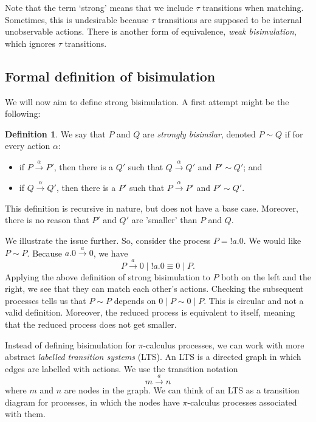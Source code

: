\documentclass[a4paper, openany]{memoir}
\theoremstyle{definition}
\newtheorem{definition}[proposition]{Definition}
\begin{document}
    Note that the term `strong' means that we include $\tau$ transitions when matching. Sometimes, this is undesirable because $\tau$ transitions are supposed to be internal unobservable actions. There is another form of equivalence, \emph{weak bisimulation}, which ignores $\tau$ transitions.

    \subsection{Formal definition of bisimulation}
    We will now aim to define strong bisimulation. A first attempt might be the following:
    \begin{definition}
        We say that $P$ and $Q$ are \emph{strongly bisimilar}, denoted $P \sim Q$ if for every action $\alpha$:
        \begin{itemize}
            \item if $P \xrightarrow{\alpha} P'$, then there is a $Q'$ such that $Q \xrightarrow{\alpha} Q'$ and $P' \sim Q'$; and
            \item if $Q \xrightarrow{\alpha} Q'$, then there is a $P'$ such that $P \xrightarrow{\alpha} P'$ and $P' \sim Q'$.
        \end{itemize}
    \end{definition}
    This definition is recursive in nature, but does not have a base case. Moreover, there is no reason that $P'$ and $Q'$ are 'smaller' than $P$ and $Q$.

    We illustrate the issue further. So, consider the process $P = {!a.0}$. We would like $P \sim P$. Because $a.0 \xrightarrow{a} 0$, we have
    \[P \xrightarrow{a} 0 \mid {!a.0} \equiv 0 \mid P.\]
    Applying the above definition of strong bisimulation to $P$ both on the left and the right, we see that they can match each other's actions. Checking the subsequent processes tells us that $P \sim P$ depends on $0 \mid P \sim 0 \mid P$. This is circular and not a valid definition. Moreover, the reduced process is equivalent to itself, meaning that the reduced process does not get smaller.

    Instead of defining bisimulation for $\pi$-calculus processes, we can work with more abstract \emph{labelled transition systems} (LTS). An LTS is a directed graph in which edges are labelled with actions. We use the transition notation
    \[m \xrightarrow{a} n\]
    where $m$ and $n$ are nodes in the graph. We can think of an LTS as a transition diagram for processes, in which the nodes have $\pi$-calculus processes associated with them.
\end{document}
